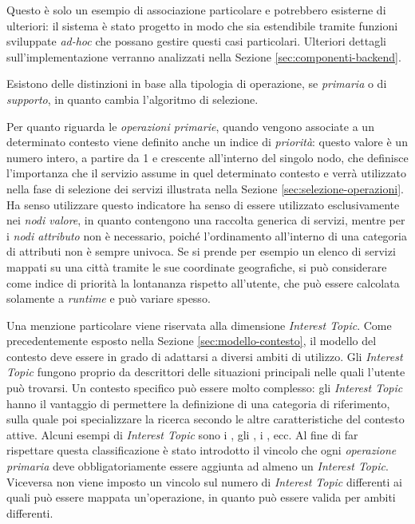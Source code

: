 Questo è solo un esempio di associazione particolare e potrebbero esisterne di ulteriori: il sistema è stato progetto in modo che sia estendibile tramite funzioni sviluppate \emph{ad-hoc} che possano gestire questi casi particolari. Ulteriori dettagli sull'implementazione verranno analizzati nella Sezione \ref{sec:componenti-backend}.

Esistono delle distinzioni in base alla tipologia di operazione, se \emph{primaria} o di \emph{supporto}, in quanto cambia l'algoritmo di selezione.

Per quanto riguarda le \emph{operazioni primarie}, quando vengono associate a un determinato contesto viene definito anche un indice di \emph{priorità}: questo valore è un numero intero, a partire da 1 e crescente all'interno del singolo nodo, che definisce l'importanza che il servizio assume in quel determinato contesto e verrà utilizzato nella fase di selezione dei servizi illustrata nella Sezione \ref{sec:selezione-operazioni}. Ha senso utilizzare questo indicatore ha senso di essere utilizzato esclusivamente nei \emph{nodi valore}, in quanto contengono una raccolta generica di servizi, mentre per i \emph{nodi attributo} non è necessario, poiché l'ordinamento all'interno di una categoria di attributi non è sempre univoca. Se si prende per esempio un elenco di servizi mappati su una città tramite le sue coordinate geografiche, si può considerare come indice di priorità la lontananza rispetto all'utente, che può essere calcolata solamente a \emph{runtime} e può variare spesso.

Una menzione particolare viene riservata alla dimensione \emph{Interest Topic}. Come precedentemente esposto nella Sezione \ref{sec:modello-contesto}, il modello del contesto deve essere in grado di adattarsi a diversi ambiti di utilizzo. Gli \emph{Interest Topic} fungono proprio da descrittori delle situazioni principali nelle quali l'utente può trovarsi. Un contesto specifico può essere molto complesso: gli \emph{Interest Topic} hanno il vantaggio di permettere la definizione di una categoria di riferimento, sulla quale poi specializzare la ricerca secondo le altre caratteristiche del contesto attive. Alcuni esempi di \emph{Interest Topic} sono i , gli , i , ecc.
Al fine di far rispettare questa classificazione è stato introdotto il vincolo che ogni \emph{operazione primaria} deve obbligatoriamente essere aggiunta ad almeno un \emph{Interest Topic}. Viceversa non viene imposto un vincolo sul numero di \emph{Interest Topic} differenti ai quali può essere mappata un'operazione, in quanto può essere valida per ambiti differenti.


